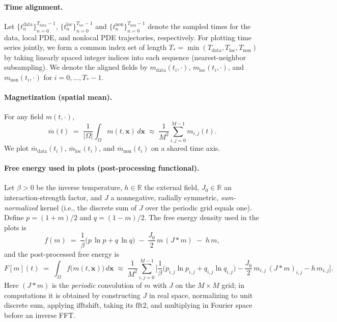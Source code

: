 \documentclass[11pt,a4paper]{article}
\begin{document}
\paragraph{Time alignment.} Let $\{t^{\text{data}}_n\}_{n=0}^{T_{\text{data}}-1}$, $\{t^{\text{loc}}_n\}_{n=0}^{T_{\text{loc}}-1}$ and $\{t^{\text{non}}_n\}_{n=0}^{T_{\text{non}}-1}$ denote the sampled times for the data, local PDE, and nonlocal PDE trajectories, respectively. For plotting time series jointly, we form a common index set of length $T_\ast=\min(T_{\text{data}},T_{\text{loc}},T_{\text{non}})$ by taking linearly spaced integer indices into each sequence (nearest-neighbor subsampling). We denote the aligned fields by $m_{\text{data}}(t_i,\cdot)$, $m_{\text{loc}}(t_i,\cdot)$, and $m_{\text{non}}(t_i,\cdot)$ for $i=0,\dots,T_\ast-1$.

\paragraph{Magnetization (spatial mean).} For any field $m(t,\cdot)$,
\begin{equation}
    \overline{m}(t) \;=\; \frac{1}{|\Omega|} \int_{\Omega} m(t,\mathbf{x})\,d\mathbf{x}
    \;\approx\; \frac{1}{M^2} \sum_{i,j=0}^{M-1} m_{i,j}(t).
\end{equation}
We plot $\overline{m}_{\text{data}}(t_i)$, $\overline{m}_{\text{loc}}(t_i)$, and $\overline{m}_{\text{non}}(t_i)$ on a shared time axis.

\paragraph{Free energy used in plots (post-processing functional).} Let $\beta>0$ be the inverse temperature, $h\in\mathbb{R}$ the external field, $J_0\in\mathbb{R}$ an interaction-strength factor, and $J$ a nonnegative, radially symmetric, \emph{sum-normalized} kernel (i.e., the discrete sum of $J$ over the periodic grid equals one). Define $p=(1+m)/2$ and $q=(1-m)/2$. The free energy density used in the plots is
\begin{equation}
    f(m) \;=\; \frac{1}{\beta}\Big( p\,\ln p + q\,\ln q \Big)
    \; -\; \frac{J_0}{2}\, m\, (J*m)
    \; -\; h\, m,
\end{equation}
and the post-processed free energy is
\begin{equation}
    F[m](t) \;=\; \int_{\Omega} f\big(m(t,\mathbf{x})\big)\,d\mathbf{x}
    \;\approx\; \frac{1}{M^2} \sum_{i,j=0}^{M-1} \Bigg[ \frac{1}{\beta}\Big( p_{i,j}\ln p_{i,j} + q_{i,j}\ln q_{i,j} \Big)
    - \frac{J_0}{2}\, m_{i,j}\, (J*m)_{i,j}
    - h\, m_{i,j} \Bigg].
\end{equation}
Here $(J*m)$ is the \emph{periodic} convolution of $m$ with $J$ on the $M\times M$ grid; in computations it is obtained by constructing $J$ in real space, normalizing to unit discrete sum, applying $\mathrm{ifftshift}$, taking its $\mathrm{fft2}$, and multiplying in Fourier space before an inverse FFT.
\end{document}
